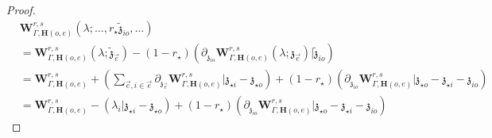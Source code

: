 \documentclass[11pt]{amsart}
\theoremstyle{definition}
\theoremstyle{remark}
\numberwithin{equation}{section}
\begin{document}
\begin{proof}
$$$$
\begin{align*}
   &  \mathbf{W}^{r,s}_{\Gamma,\mathbf{H}(o,e)}(\lambda;\dots,r_{\star}\tilde{\mathfrak{z}}_{io},\dots)\\
   & =\mathbf{W}^{r,s}_{\Gamma,\mathbf{H}(o,e)}(\lambda;\tilde{\mathfrak{z}}_{\vec{e}})-(1-r_{\star})\left(\partial_{\mathfrak{z}_{io}}\mathbf{W}^{r,s}_{\Gamma,\mathbf{H}(o,e)}(\lambda;{\mathfrak{z}}_{\vec{e}})|\tilde{\mathfrak{z}}_{io}\right)\\
   &=\mathbf{W}^{r,s}_{\Gamma,\mathbf{H}(o,e)}+\left(\sum_{\vec{e},i\in \vec{e}} \partial_{\mathfrak{z}_{\vec{e}}}  \mathbf{W}^{r,s}_{\Gamma,\mathbf{H}(o,e)}|\mathfrak{z}_{\star i}-\mathfrak{z}_{\star o}\right)+(1-r_{\star})\left(\partial_{\mathfrak{z}_{io}}\mathbf{W}^{r,s}_{\Gamma,\mathbf{H}(o,e)}|\mathfrak{z}_{\star o}-\mathfrak{z}_{\star i}-\mathfrak{z}_{io}\right)\\
   &=\mathbf{W}^{r,s}_{\Gamma,\mathbf{H}(o,e)}-\left(\lambda_i|\mathfrak{z}_{\star i}-\mathfrak{z}_{\star o}\right)+(1-r_{\star})\left(\partial_{\mathfrak{z}_{io}}\mathbf{W}^{r,s}_{\Gamma,\mathbf{H}(o,e)}|\mathfrak{z}_{\star o}-\mathfrak{z}_{\star i}-\mathfrak{z}_{io}\right)
\end{align*}


\end{proof}
\end{document}
